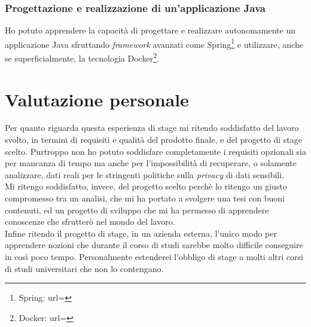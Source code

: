 \subsubsection{Progettazione e realizzazione di un'applicazione Java}
Ho potuto apprendere la capacità di progettare e realizzare autonomamente un applicazione Java sfruttando \textit{framework} avanzati come Spring\footnote{Spring: url= } e utilizzare, anche se superficialmente, la tecnologia Docker\footnote{Docker: url= }.
\section{Valutazione personale}
Per quanto riguarda questa esperienza di stage mi ritendo soddisfatto del lavoro svolto, in termini di requisiti e qualità del prodotto finale, e del progetto di stage scelto. Purtroppo non ho potuto soddisfare completamente i requisiti opzionali sia per mancanza di tempo ma anche per l'impossibilità di recuperare, o solamente analizzare, dati reali per le stringenti politiche sulla \textit{privacy} di dati sensibili.\\
Mi ritengo soddisfatto, invece, del progetto scelto perchè lo ritengo un giusto compromesso tra un analisi, che mi ha portato a svolgere una tesi con buoni contenuti, ed un progetto di sviluppo che mi ha permesso di apprendere conoscenze che sfrutterò nel mondo del lavoro.\\
Infine ritendo il progetto di stage, in un azienda esterna, l'unico modo per apprendere nozioni che durante il corso di studi sarebbe molto difficile conseguire in così poco tempo. Personalmente estenderei l'obbligo di stage a molti altri corsi di studi universitari che non lo contengano.
